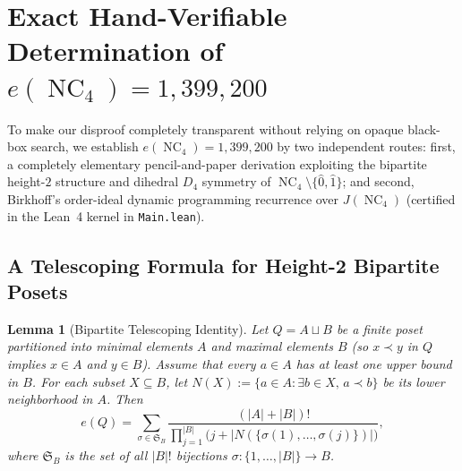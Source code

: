 \documentclass[11pt]{article}
\newtheorem{lemma}[theorem]{Lemma}
\theoremstyle{definition}
\newcommand{\NC}{\operatorname{NC}}
\newcommand{\Sym}{\mathfrak{S}}
\begin{document}
\section{Exact Hand-Verifiable Determination of \texorpdfstring{$e(\NC_4) = 1{,}399{,}200$}{e(NC4) = 1,399,200}}

To make our disproof completely transparent without relying on opaque black-box search,
we establish $e(\NC_4) = 1{,}399{,}200$ by two independent routes: first, a completely
elementary pencil-and-paper derivation exploiting the bipartite height-$2$ structure and
dihedral $D_4$ symmetry of $\NC_4 \setminus \{\hat{0}, \hat{1}\}$; and second, Birkhoff's
order-ideal dynamic programming recurrence over $J(\NC_4)$ (certified in the Lean~4
kernel in \texttt{Main.lean}).

\subsection{A Telescoping Formula for Height-2 Bipartite Posets}

\begin{lemma}[Bipartite Telescoping Identity]\label{lem:bipartite}
Let $Q = A \sqcup B$ be a finite poset partitioned into minimal elements $A$ and maximal
elements $B$ (so $x \prec y$ in $Q$ implies $x \in A$ and $y \in B$). Assume that every
$a \in A$ has at least one upper bound in $B$. For each subset $X \subseteq B$, let
$N(X) := \{a \in A : \exists b \in X,\, a \prec b\}$ be its lower neighborhood in $A$.
Then
\begin{equation}\label{eq:bipartite}
  e(Q) = \sum_{\sigma \in \Sym_B}
  \frac{(|A| + |B|)!}{\prod_{j=1}^{|B|} \bigl(j + |N(\{\sigma(1), \dots, \sigma(j)\})|\bigr)},
\end{equation}
where $\Sym_B$ is the set of all $|B|!$ bijections $\sigma : \{1, \dots, |B|\} \to B$.
\end{lemma}
\end{document}
